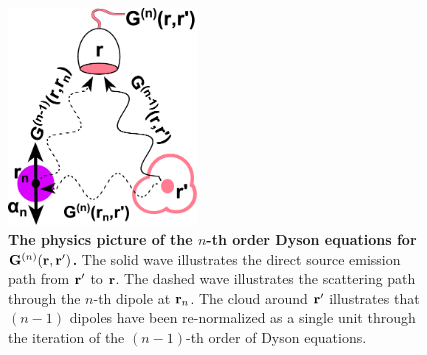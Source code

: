 \begin{figure}[htp]%
\centering
\begin{center}
\includegraphics[width=5cm]{./Figs/GnDetection}%
\end{center}
\caption[The physics picture of Dyson equations.]{\textbf{The physics picture of the $n$-th order Dyson equations for $\mathbf{G}^{(n)}(\mathbf{r},\mathbf{r}')$.} The solid wave illustrates the direct source emission path from $\mathbf{r}'$ to $\mathbf{r}$. The dashed wave illustrates the scattering path through the $n$-th dipole at $\mathbf{r}_n$. The cloud around $\mathbf{r}'$ illustrates that $(n-1)$ dipoles have been re-normalized as a single unit through the iteration of the $(n-1)$-th order of Dyson equations. }
\label{GnDetection}
\end{figure}

